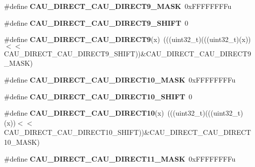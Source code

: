 \begin{DoxyCompactItemize}
\item 
\#define {\bfseries C\+A\+U\+\_\+\+D\+I\+R\+E\+C\+T\+\_\+\+C\+A\+U\+\_\+\+D\+I\+R\+E\+C\+T9\+\_\+\+M\+A\+SK}~0x\+F\+F\+F\+F\+F\+F\+F\+Fu\hypertarget{group__CAU__Register__Masks_ga5ccc68fd1b7c526efb4a5074bb8039ee}{}\label{group__CAU__Register__Masks_ga5ccc68fd1b7c526efb4a5074bb8039ee}

\item 
\#define {\bfseries C\+A\+U\+\_\+\+D\+I\+R\+E\+C\+T\+\_\+\+C\+A\+U\+\_\+\+D\+I\+R\+E\+C\+T9\+\_\+\+S\+H\+I\+FT}~0\hypertarget{group__CAU__Register__Masks_gaca4b04f898d0a3dac43986b076af6f91}{}\label{group__CAU__Register__Masks_gaca4b04f898d0a3dac43986b076af6f91}

\item 
\#define {\bfseries C\+A\+U\+\_\+\+D\+I\+R\+E\+C\+T\+\_\+\+C\+A\+U\+\_\+\+D\+I\+R\+E\+C\+T9}(x)~(((uint32\+\_\+t)(((uint32\+\_\+t)(x))$<$$<$C\+A\+U\+\_\+\+D\+I\+R\+E\+C\+T\+\_\+\+C\+A\+U\+\_\+\+D\+I\+R\+E\+C\+T9\+\_\+\+S\+H\+I\+FT))\&C\+A\+U\+\_\+\+D\+I\+R\+E\+C\+T\+\_\+\+C\+A\+U\+\_\+\+D\+I\+R\+E\+C\+T9\+\_\+\+M\+A\+SK)\hypertarget{group__CAU__Register__Masks_ga5658308db6b0a058df6a89a1300338f1}{}\label{group__CAU__Register__Masks_ga5658308db6b0a058df6a89a1300338f1}

\item 
\#define {\bfseries C\+A\+U\+\_\+\+D\+I\+R\+E\+C\+T\+\_\+\+C\+A\+U\+\_\+\+D\+I\+R\+E\+C\+T10\+\_\+\+M\+A\+SK}~0x\+F\+F\+F\+F\+F\+F\+F\+Fu\hypertarget{group__CAU__Register__Masks_ga3115929e73e7c6a2c3b24d69e6215c55}{}\label{group__CAU__Register__Masks_ga3115929e73e7c6a2c3b24d69e6215c55}

\item 
\#define {\bfseries C\+A\+U\+\_\+\+D\+I\+R\+E\+C\+T\+\_\+\+C\+A\+U\+\_\+\+D\+I\+R\+E\+C\+T10\+\_\+\+S\+H\+I\+FT}~0\hypertarget{group__CAU__Register__Masks_gadc78db3adb857bc20e4387835eabdeab}{}\label{group__CAU__Register__Masks_gadc78db3adb857bc20e4387835eabdeab}

\item 
\#define {\bfseries C\+A\+U\+\_\+\+D\+I\+R\+E\+C\+T\+\_\+\+C\+A\+U\+\_\+\+D\+I\+R\+E\+C\+T10}(x)~(((uint32\+\_\+t)(((uint32\+\_\+t)(x))$<$$<$C\+A\+U\+\_\+\+D\+I\+R\+E\+C\+T\+\_\+\+C\+A\+U\+\_\+\+D\+I\+R\+E\+C\+T10\+\_\+\+S\+H\+I\+FT))\&C\+A\+U\+\_\+\+D\+I\+R\+E\+C\+T\+\_\+\+C\+A\+U\+\_\+\+D\+I\+R\+E\+C\+T10\+\_\+\+M\+A\+SK)\hypertarget{group__CAU__Register__Masks_ga8a2c9297ddc5ff59b14e74324ecdd316}{}\label{group__CAU__Register__Masks_ga8a2c9297ddc5ff59b14e74324ecdd316}

\item 
\#define {\bfseries C\+A\+U\+\_\+\+D\+I\+R\+E\+C\+T\+\_\+\+C\+A\+U\+\_\+\+D\+I\+R\+E\+C\+T11\+\_\+\+M\+A\+SK}~0x\+F\+F\+F\+F\+F\+F\+F\+Fu\hypertarget{group__CAU__Register__Masks_gaf2b9a81af0187f3bb946b6d0a371a05f}{}\label{group__CAU__Register__Masks_gaf2b9a81af0187f3bb946b6d0a371a05f}


\end{DoxyCompactItemize}
